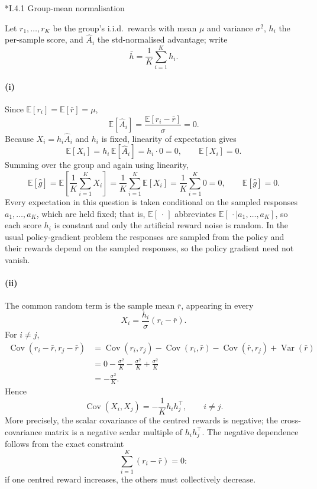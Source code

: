 \documentclass[11pt]{article}
\makeatletter
\let\origsubsec\subsection
\renewcommand{\subsection}{\@ifstar{\tx@subsec}{\origsubsec}}
\newcommand{\tx@subsec}[1]{\phantomsection\origsubsec*{#1}\addcontentsline{toc}{subsubsection}{#1}}
\makeatother
\begin{document}
\subsection*{I.4.1 Group-mean normalisation}

Let $r_1,\dots,r_K$ be the group's i.i.d.\ rewards with mean $\mu$ and variance $\sigma^2$, $h_i$ the per-sample score, and $\hat A_i$ the std-normalised advantage; write
\[
\bar h=\frac{1}{K}\sum_{i=1}^K h_i.
\]

\paragraph{(i)}
Since $\mathbb{E}[r_i]=\mathbb{E}[\bar r]=\mu$,
\[
\mathbb{E}[\hat A_i]
=
\frac{\mathbb{E}[r_i-\bar r]}{\sigma}
=0.
\]
Because $X_i=h_i\hat A_i$ and $h_i$ is fixed, linearity of expectation gives
\[
\mathbb{E}[X_i]
=
h_i\,\mathbb{E}[\hat A_i]
=
h_i\cdot 0
=0,
\qquad
\mathbb{E}[X_i]=0.
\]
Summing over the group and again using linearity,
\[
\mathbb{E}[\hat g]
=
\mathbb{E}\!\left[\frac{1}{K}\sum_{i=1}^K X_i\right]
=
\frac{1}{K}\sum_{i=1}^K\mathbb{E}[X_i]
=
\frac{1}{K}\sum_{i=1}^K 0
=0,
\qquad
\mathbb{E}[\hat g]=0.
\]
Every expectation in this question is taken conditional on the sampled
responses $a_1,\dots,a_K$, which are held fixed; that is, $\mathbb{E}[\,\cdot\,]$
abbreviates $\mathbb{E}[\,\cdot\mid a_1,\dots,a_K]$, so each score $h_i$ is
constant and only the artificial reward noise is random. In the usual
policy-gradient problem the responses are sampled from the policy and their
rewards depend on the sampled responses, so the policy gradient need not vanish.

\paragraph{(ii)}
The common random term is the sample mean $\bar r$, appearing in every
\[
X_i=\frac{h_i}{\sigma}(r_i-\bar r).
\]
For $i\neq j$,
\begin{align*}
\operatorname{Cov}(r_i-\bar r,r_j-\bar r)
&=
\operatorname{Cov}(r_i,r_j)
-\operatorname{Cov}(r_i,\bar r)
-\operatorname{Cov}(\bar r,r_j)
+\operatorname{Var}(\bar r)\\
&=
0-\frac{\sigma^2}{K}-\frac{\sigma^2}{K}
+\frac{\sigma^2}{K}\\
&=
-\frac{\sigma^2}{K}.
\end{align*}
Hence
\[
\operatorname{Cov}(X_i,X_j)
=
-\frac{1}{K}h_i h_j^\top,
\qquad i\neq j.
\]
More precisely, the scalar covariance of the centred rewards is negative; the
cross-covariance matrix is a negative scalar multiple of $h_i h_j^\top$.
The negative dependence follows from the exact constraint
\[
\sum_{i=1}^K(r_i-\bar r)=0:
\]
if one centred reward increases, the others must collectively decrease.
\end{document}
